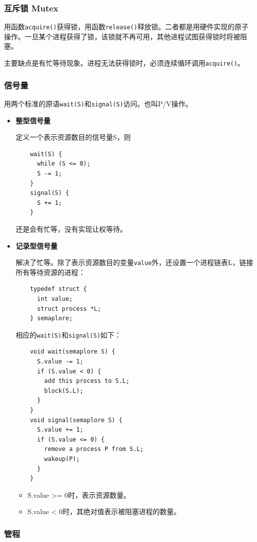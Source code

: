 \documentclass[12pt, a4paper, oneside]{ctexart}
\begin{document}
\subsubsection{互斥锁 Mutex}

用函数\verb|acquire()|获得锁，用函数\verb|release()|释放锁。二者都是用硬件实现的原子操作。一旦某个进程获得了锁，该锁就不再可用，其他进程试图获得锁时将被阻塞。

主要缺点是有忙等待现象。进程无法获得锁时，必须连续循环调用\verb|acquire()|。

\subsubsection{信号量}

用两个标准的原语\verb|wait(S)|和\verb|signal(S)|访问。也叫P/V操作。

\begin{itemize}
  \item {\bf 整型信号量}
  
  定义一个表示资源数目的信号量S，则
  \begin{lstlisting}
    wait(S) {
      while (S <= 0);
      S -= 1;
    }
    signal(S) {
      S += 1;
    }
  \end{lstlisting}
  还是会有忙等，没有实现让权等待。
  \item {\bf 记录型信号量}
  
  解决了忙等。除了表示资源数目的变量\verb|value|外，还设置一个进程链表L，链接所有等待资源的进程：
  \begin{lstlisting}
    typedef struct {
      int value;
      struct process *L;
    } semaplore;
  \end{lstlisting}
  相应的\verb|wait(S)|和\verb|signal(S)|如下：
  \begin{lstlisting}
    void wait(semaplore S) {
      S.value -= 1;
      if (S.value < 0) {
        add this process to S.L;
        block(S.L);
      }
    }
    void signal(semaplore S) {
      S.value += 1;
      if (S.value <= 0) {
        remove a process P from S.L;
        wakeup(P);
      }
    }
  \end{lstlisting}
  \begin{itemize}
    \item S.value >= 0时，表示资源数量。
    \item S.value < 0时，其绝对值表示被阻塞进程的数量。
  \end{itemize}
\end{itemize}

\subsubsection{管程}
\end{document}
